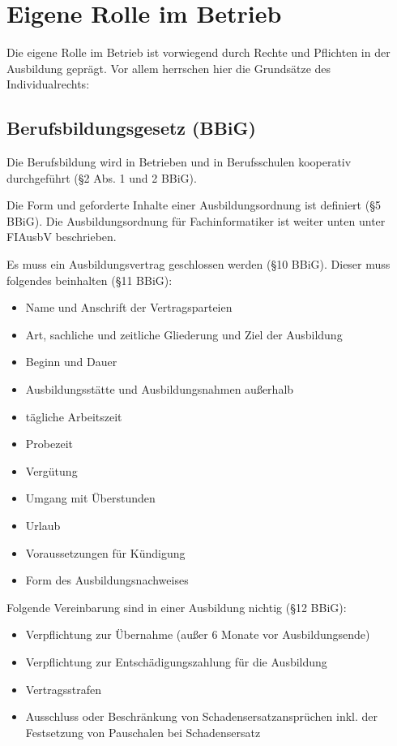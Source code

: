 \section{Eigene Rolle im Betrieb}

Die eigene Rolle im Betrieb ist vorwiegend durch Rechte und Pflichten in der Ausbildung geprägt. Vor allem herrschen hier die Grundsätze des Individualrechts:

\subsection{Berufsbildungsgesetz (BBiG)}

Die Berufsbildung wird in Betrieben und in Berufsschulen kooperativ durchgeführt (§2 Abs. 1 und 2 BBiG).

Die Form und geforderte Inhalte einer Ausbildungsordnung ist definiert (§5 BBiG). Die Ausbildungsordnung für Fachinformatiker ist weiter unten unter FIAusbV beschrieben.

Es muss ein Ausbildungsvertrag geschlossen werden (§10 BBiG). Dieser muss folgendes beinhalten (§11 BBiG):

\begin{itemize}
    \item Name und Anschrift der Vertragsparteien
    \item Art, sachliche und zeitliche Gliederung und Ziel der Ausbildung
    \item Beginn und Dauer
    \item Ausbildungsstätte und Ausbildungsnahmen außerhalb
    \item tägliche Arbeitszeit
    \item Probezeit
    \item Vergütung
    \item Umgang mit Überstunden
    \item Urlaub
    \item Voraussetzungen für Kündigung
    \item Form des Ausbildungsnachweises
\end{itemize}

Folgende Vereinbarung sind in einer Ausbildung nichtig (§12 BBiG):

\begin{itemize}
    \item Verpflichtung zur Übernahme (außer 6 Monate vor Ausbildungsende)
    \item Verpflichtung zur Entschädigungszahlung für die Ausbildung
    \item Vertragsstrafen
    \item Ausschluss oder Beschränkung von Schadensersatzansprüchen inkl. der Festsetzung von Pauschalen bei Schadensersatz
\end{itemize}

